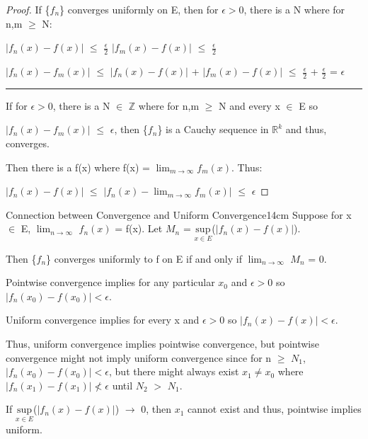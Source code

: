     \begin{proof}
        If \{$f_n$\} converges uniformly on E, then for $\epsilon > 0$, there is a N
        where for n,m $\geq$ N:

        \hspace{0.5cm}
        $|f_n(x) - f(x)|$ $\leq$ $\frac{\epsilon}{2}$
        \hspace{1cm}
        $|f_m(x) - f(x)|$ $\leq$ $\frac{\epsilon}{2}$

        \hspace{0.5cm}
        $|f_n(x) - f_m(x)|$
        $\leq$ $|f_n(x) - f(x)|$ + $|f_m(x) - f(x)|$
        $\leq$ $\frac{\epsilon}{2}$ + $\frac{\epsilon}{2}$
        = $\epsilon$

        \rule[0.1cm]{15cm}{0.01cm}

        If for $\epsilon > 0$, there is a N $\in$ $\mathbb{Z}$ where for n,m $\geq$ N
        and every x $\in$ E so

        $|f_n(x) - f_m(x)|$ $\leq$ $\epsilon$, then \{$f_n$\} is a Cauchy sequence
        in $\mathbb{R}^k$ and thus, converges.

        Then there is a f(x) where f(x) = $\lim_{m \rightarrow \infty} f_m(x)$. Thus:

        \hspace{0.5cm}
        $|f_n(x) - f(x)|$
        $\leq$ $|f_n(x) - \lim_{m \rightarrow \infty} f_m(x)|$
        $\leq$ $\epsilon$
    \end{proof}

    \newpage



    \begin{wtheorem}{Connection between Convergence and Uniform Convergence}{14cm}
        Suppose for x $\in$ E, $\lim_{n \rightarrow \infty}$ $f_n(x)$ = f(x).
        Let $M_n$ = $\underset{x \in E}{\text{sup}}$($|f_n(x) - f(x)|$).

        Then \{$f_n$\} converges uniformly to f on E if and only if
        $\lim_{n \rightarrow \infty}$ $M_n$ = 0.        
    \end{wtheorem}

    \begin{intuition}
        Pointwise convergence implies for any particular $x_0$ and $\epsilon > 0$
        so $|f_n(x_0) - f(x_0)| < \epsilon$.

        Uniform convergence implies for every x and $\epsilon > 0$
        so $|f_n(x) - f(x)| < \epsilon$.

        \vspace{0.2cm}

        Thus, uniform convergence implies pointwise convergence, but pointwise
        convergence might not imply uniform convergence since for n $\geq$ $N_1$,
        $|f_n(x_0) - f(x_0)| < \epsilon$, but there might always exist
        $x_1 \not = x_0$ where $|f_n(x_1) - f(x_1)| \not < \epsilon$
        until $N_2$ $>$ $N_1$.

        If $\underset{x \in E}{\text{sup}}$($|f_n(x) - f(x)|$) $\rightarrow$ 0,
        then $x_1$ cannot exist and thus, pointwise implies uniform.
    \end{intuition}
    
